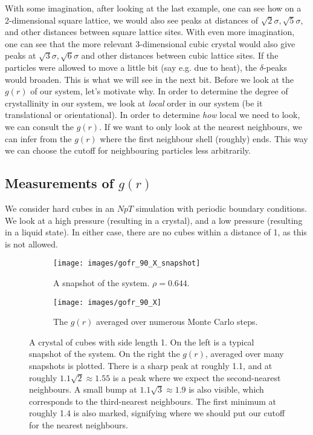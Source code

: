 \documentclass[thesis]{subfiles}
\begin{document}
With some imagination, after looking at the last example, one can see how on a 2-dimensional square lattice, we would also see peaks at distances of $\sqrt 2\sigma, \sqrt 5\sigma$, and other distances between square lattice sites. With even more imagination, one can see that the more relevant 3-dimensional cubic crystal would also give peaks at $\sqrt 3 \sigma, \sqrt 6 \sigma$ and other distances between cubic lattice sites.
If the particles were allowed to move a little bit (say e.g. due to heat), the $\delta$-peaks would broaden. This is what we will see in the next bit.
\bigbreak
Before we look at the $g(r)$ of our system, let's motivate why. In order to determine the degree of crystallinity in our system, we look at \emph{local} order in our system (be it translational or orientational). In order to determine \emph{how} local we need to look, we can consult the $g(r)$. If we want to only look at the nearest neighbours, we can infer from the $g(r)$ where the first neighbour shell (roughly) ends. This way we can choose the cutoff for neighbouring particles less arbitrarily.

\subsection{Measurements of \texorpdfstring{$g(r)$}{g(r)}}

We consider hard cubes in an $NpT$ simulation with periodic boundary conditions. We look at a high pressure (resulting in a crystal), and a low pressure (resulting in a liquid state). In either case, there are no cubes within a distance of 1, as this is not allowed.

\begin{figure}[H]
	\centering
	\begin{subfigure}{0.3\textwidth}
		\centering
		\texttt{[image: images/gofr\_90\_X\_snapshot]}
		\caption{A snapshot of the system. $\rho = 0.644$.}
	\end{subfigure}
	\begin{subfigure}{0.5\textwidth}
		\centering
		\texttt{[image: images/gofr\_90\_X]}
		\caption{The $g(r)$ averaged over numerous Monte Carlo steps.}
		\label{fig:gofr_crystal_b}
	\end{subfigure}
	\caption{A crystal of cubes with side length 1. On the left is a typical snapshot of the system. On the right the $g(r)$, averaged over many  snapshots is plotted. There is a sharp peak at roughly 1.1, and at roughly $1.1 \sqrt 2 \approx 1.55$ is a peak where we expect the second-nearest neighbours. A small bump at $1.1 \sqrt 3 \approx 1.9$ is also visible, which corresponds to the third-nearest neighbours. The first minimum at roughly 1.4 is also marked, signifying where we should put our cutoff for the nearest neighbours.}
\end{figure}
\end{document}
